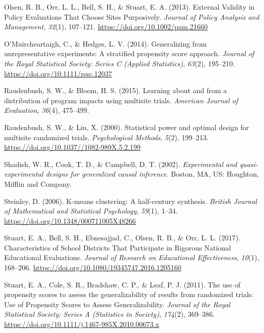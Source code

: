 \documentclass[
  english,
  man,floatsintext]{apa6}
\begin{document}
\leavevmode\hypertarget{ref-olsenExternalValidityPolicy2013}{}%
Olsen, R. B., Orr, L. L., Bell, S. H., \& Stuart, E. A. (2013). External Validity in Policy Evaluations That Choose Sites Purposively. \emph{Journal of Policy Analysis and Management}, \emph{32}(1), 107--121. \url{https://doi.org/10.1002/pam.21660}

\leavevmode\hypertarget{ref-omuircheartaighGeneralizingUnrepresentativeExperiments2014}{}%
O'Muircheartaigh, C., \& Hedges, L. V. (2014). Generalizing from unrepresentative experiments: A stratified propensity score approach. \emph{Journal of the Royal Statistical Society: Series C (Applied Statistics)}, \emph{63}(2), 195--210. \url{https://doi.org/10.1111/rssc.12037}

\leavevmode\hypertarget{ref-raudenbush2015learning}{}%
Raudenbush, S. W., \& Bloom, H. S. (2015). Learning about and from a distribution of program impacts using multisite trials. \emph{American Journal of Evaluation}, \emph{36}(4), 475--499.

\leavevmode\hypertarget{ref-raudenbushStatisticalPowerOptimal2000}{}%
Raudenbush, S. W., \& Liu, X. (2000). Statistical power and optimal design for multisite randomized trials. \emph{Psychological Methods}, \emph{5}(2), 199--213. \url{https://doi.org/10.1037//1082-989X.5.2.199}

\leavevmode\hypertarget{ref-shadishExperimentalQuasiexperimentalDesigns2002}{}%
Shadish, W. R., Cook, T. D., \& Campbell, D. T. (2002). \emph{Experimental and quasi-experimental designs for generalized causal inference}. Boston, MA, US: Houghton, Mifflin and Company.

\leavevmode\hypertarget{ref-steinleyKmeansClusteringHalfcentury2006}{}%
Steinley, D. (2006). K-means clustering: A half-century synthesis. \emph{British Journal of Mathematical and Statistical Psychology}, \emph{59}(1), 1--34. \url{https://doi.org/10.1348/000711005X48266}

\leavevmode\hypertarget{ref-stuartCharacteristicsSchoolDistricts2017}{}%
Stuart, E. A., Bell, S. H., Ebnesajjad, C., Olsen, R. B., \& Orr, L. L. (2017). Characteristics of School Districts That Participate in Rigorous National Educational Evaluations. \emph{Journal of Research on Educational Effectiveness}, \emph{10}(1), 168--206. \url{https://doi.org/10.1080/19345747.2016.1205160}

\leavevmode\hypertarget{ref-stuartUsePropensityScores2011}{}%
Stuart, E. A., Cole, S. R., Bradshaw, C. P., \& Leaf, P. J. (2011). The use of propensity scores to assess the generalizability of results from randomized trials: Use of Propensity Scores to Assess Generalizability. \emph{Journal of the Royal Statistical Society: Series A (Statistics in Society)}, \emph{174}(2), 369--386. \url{https://doi.org/10.1111/j.1467-985X.2010.00673.x}
\end{document}
